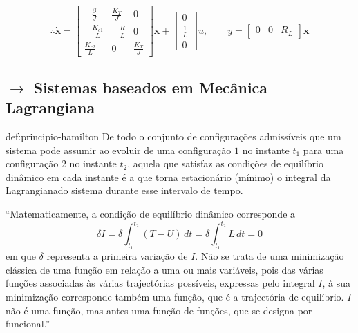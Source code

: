 $$
    \therefore \dot{\pmb{x}} = 
    \begin{bmatrix} 
        -\frac{\beta}{J} & \frac{K_T}{J} & 0\\[5pt]
        -\frac{K_{e1}}{L} & -\frac{R}{L} & 0\\[5pt]
        \frac{K_{e2}}{L} & 0 & \frac{K_T}{J}
    \end{bmatrix}
    \pmb{x} +
    \begin{bmatrix} 
        0\\[5pt]
        \frac{1}{L}\\[5pt]
        0
    \end{bmatrix}
    u,\qquad y = 
    \begin{bmatrix}
        0 & 0 & R_L
    \end{bmatrix}
    \pmb{x}
$$

\clearpage
\subsection[3.2 Sistemas baseados em Mecânica Lagrangiana]{$\rightarrow$ Sistemas baseados em Mecânica Lagrangiana}
\label{sec:mechanics-lagrangian}

\renewcommand*{\thefootnote}{\fnsymbol{footnote}}
\begin{theo}{def:principio-hamilton}\label{def:principio-hamilton}
    De todo o conjunto de configurações admissíveis que um sistema pode assumir ao evoluir de uma configuração $1$ no instante $t_1$ para uma configuração $2$ no instante $t_2$, aquela que satisfaz as condições de equilíbrio dinâmico em cada instante é a que torna estacionário (mínimo) o integral da Lagrangiana\footnotemark[2] do sistema durante esse intervalo de tempo.
\end{theo}

\noindent ``Matematicamente, a condição de equilíbrio dinâmico corresponde a
$$
    \delta I = \delta \int_{t_1}^{t_2} (T-U) \, dt = \delta \int_{t_1}^{t_2} L \, dt = 0 
$$
em que $\delta$ representa a primeira variação de $I$. Não se trata de uma minimização clássica de uma função em relação a uma ou mais variáveis, pois das várias funções associadas às várias trajectórias possíveis, expressas pelo integral $I$, à sua minimização corresponde também uma função, que é a trajectória de equilíbrio. $I$ não é uma função, mas antes uma função de funções, que se designa por funcional.''\cite{Maia2000}
\noindent{\begin{center}\rule{8cm}{1pt} \end{center}} 

